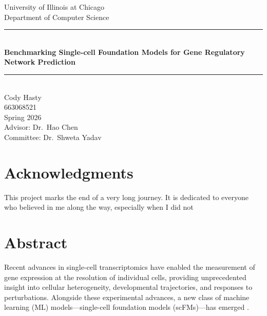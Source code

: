 \documentclass[12pt, letterpaper]{report}
\newcommand{\doctitle}{Benchmarking Single-cell Foundation Models for Gene Regulatory Network Prediction}
\newcommand{\authorname}{Cody Hasty}
\newcommand{\uin}{663068521}
\newcommand{\university}{University of Illinois at Chicago}
\newcommand{\department}{Department of Computer Science}
\newcommand{\advisor}{Dr.\ Hao Chen}
\newcommand{\secondadvisor}{Dr.\ Shweta Yadav}
\newcommand{\submitdate}{Spring 2026}
\begin{document}
\begin{titlepage}
    \centering
    \vspace*{1in}

    {\Large \university}\\[0.3cm]
    {\large \department}\\[2cm]

    \rule{\textwidth}{0.4pt}\\[0.4cm]
    {\LARGE \bfseries \doctitle}\\[0.3cm]
    \rule{\textwidth}{0.4pt}\\[2cm]

    {\Large \authorname}\\[0.25cm]
    {\large \uin}\\[0.25cm]
    {\large \submitdate}\\[2cm]

    {\large Advisor: \advisor}\\[0.5cm]
    {\large Committee: \secondadvisor}\\[1.5cm]

    \vfill
\end{titlepage}



\tableofcontents

\chapter*{Acknowledgments}

This project marks the end of a very long journey. It is dedicated to everyone who believed in me along the way, especially when I did not


\chapter*{Abstract}

Recent advances in single-cell transcriptomics have enabled the measurement of gene expression at the resolution of individual cells, providing unprecedented insight into cellular heterogeneity, developmental trajectories, and responses to perturbations. Alongside these experimental advances, a new class of machine learning (ML) models—single-cell foundation models (scFMs)—has emerged \cite{scFM_survey}.
\end{document}
